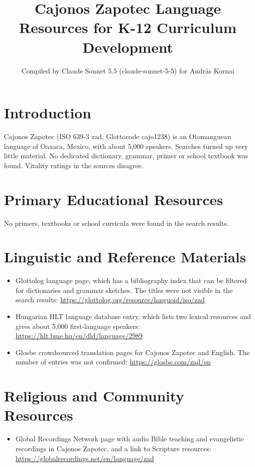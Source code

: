 \documentclass[12pt]{article}
\title{Cajonos Zapotec Language Resources for K-12 Curriculum Development}
\author{Compiled by Claude Sonnet 5.5 (claude-sonnet-5-5) for Andr\'as Kornai}
\date{}
\begin{document}
\maketitle

\section{Introduction}
Cajonos Zapotec (ISO 639-3 zad, Glottocode cajo1238) is an Otomanguean language of Oaxaca, Mexico, with about 5,000 speakers. Searches turned up very little material. No dedicated dictionary, grammar, primer or school textbook was found. Vitality ratings in the sources disagree.

\section{Primary Educational Resources}
No primers, textbooks or school curricula were found in the search results.

\section{Linguistic and Reference Materials}
\begin{itemize}
\item Glottolog language page, which has a bibliography index that can be filtered for dictionaries and grammar sketches. The titles were not visible in the search results: \url{https://glottolog.org/resource/languoid/iso/zad}
\item Hungarian HLT language database entry, which lists two lexical resources and gives about 5,000 first-language speakers: \url{https://hlt.bme.hu/en/dld/language/2989}
\item Glosbe crowdsourced translation pages for Cajonos Zapotec and English. The number of entries was not confirmed: \url{https://glosbe.com/zad/en}
\end{itemize}

\section{Religious and Community Resources}
\begin{itemize}
\item Global Recordings Network page with audio Bible teaching and evangelistic recordings in Cajonos Zapotec, and a link to Scripture resources: \url{https://globalrecordings.net/en/language/zad}
\end{itemize}
\end{document}
